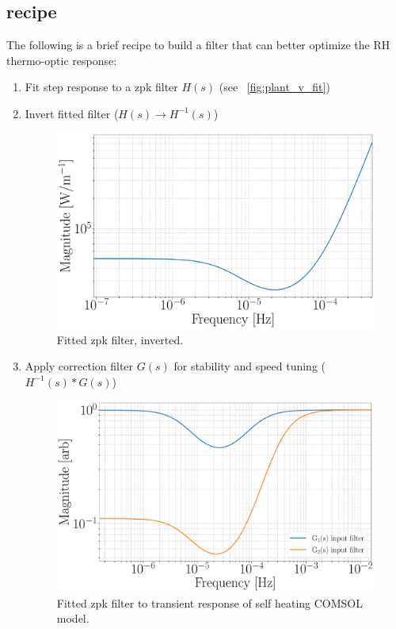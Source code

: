 \subsection{recipe}\label{appendix:rhcontrolpf}
The following is a brief recipe to build a filter that can better optimize the RH thermo-optic response:
\begin{enumerate}	
	\item Fit step response to a zpk filter $H(s)$ (see ~\autoref{fig:plant_v_fit})
	\item Invert fitted filter ($H(s) \rightarrow H^{-1}(s)$)
            \begin{figure}[H]
		\includegraphics[width=\textwidth]{figs/TCS/IRHF/RH_inv_filt.pdf}
		\caption{Fitted zpk filter, inverted.}
	        \label{fig:rh_inv_filt}
    	    \end{figure}
	\item Apply correction filter $G(s)$ for stability and speed tuning ($H^{-1}(s)*G(s)$)
	    \begin{figure}[H]
		\includegraphics[width=\textwidth]{figs/TCS/IRHF/RH_input_filt_G1_G2.pdf}
		\caption{Fitted zpk filter to transient response of self heating COMSOL model.}
	        \label{fig:rh_input_filt}
    	    \end{figure}
\end{enumerate}


